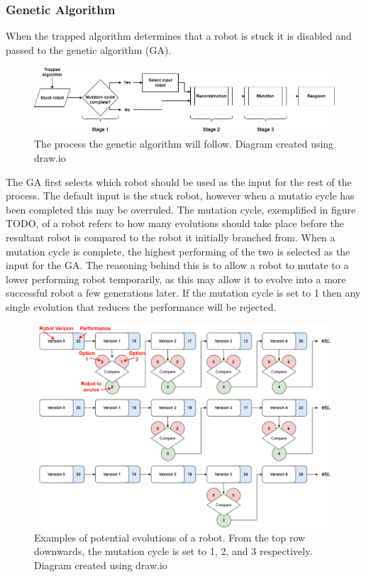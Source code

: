 \documentclass{article}
\begin{document}
\subsubsection{Genetic Algorithm}
When the trapped algorithm determines that a robot is stuck it is disabled and passed to the genetic algorithm (GA).\\
\begin{figure}[H]
\centering
\includegraphics[scale=0.4]{gaProcess}
\caption{The process the genetic algorithm will follow. Diagram created using draw.io \citep{drawio}}
\end{figure}
The GA first selects which robot should be used as the input for the rest of the process. The default input is the stuck robot, however when a mutatio cycle has been completed this may be overruled. The mutation cycle, exemplified in figure TODO, of a robot refers to how many evolutions should take place before the resultant robot is compared to the robot it initially branched from. When a mutation cycle is complete, the highest performing of the two is selected as the input for the GA. The reasoning behind this is to allow a robot to mutate to a lower performing robot temporarily, as this may allow it to evolve into a more successful robot a few generations later. If the mutation cycle is set to 1 then any single evolution that reduces the performance will be rejected.\\
\begin{figure}[H]
\centering
\includegraphics[scale=0.4]{mutationCycle}
\caption{Examples of potential evolutions of a robot. From the top row downwards, the mutation cycle is set to 1, 2, and 3 respectively. Diagram created using draw.io \citep{drawio}}
\end{figure}
\end{document}
